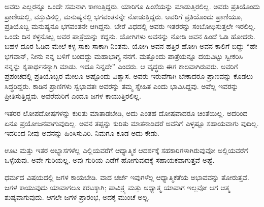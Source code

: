 ಅವರು ಎಲ್ಲರನ್ನೂ ಒಂದೇ ಸಮನಾಗಿ ಕಾಣುತ್ತಿದ್ದರು. ಯಾರಿಗೂ ಹಿಂಸೆಯನ್ನು ಮಾಡುತ್ತಿರಲಿಲ್ಲ. ಅವರು ಪ್ರತಿಯೊಂದು ಪ್ರಾಣಿಯಲ್ಲಿ, ವಸ್ತುವಿನಲ್ಲಿ, ಮನುಷ್ಯನಲ್ಲಿ ಭಗವಂತನನ್ನೇ ನೋಡುತ್ತಿದ್ದರು. ಅವರಿಗೆ ಪ್ರತಿಯೊಂದು ಪ್ರಾಣಿಯೂ, ಪ್ರತಿಯೊಬ್ಬ ಮನುಷ್ಯನೂ ಭಗವಂತನೇ ಆಗಿದ್ದನು. ಬೇರೆ ವಿಧದಲ್ಲಿ ಅವರು ಇತರರನ್ನು ಸಂಬೋಧಿಸುತ್ತಲೇ ಇರಲಿಲ್ಲ. ಒಂದು ದಿನ ಕಳ್ಳನೊಬ್ಬ ಅವರ ಪಾತ್ರೆಯನ್ನು ಕದ್ದನು. ಯೋಗಿಗಳು ಅವನನ್ನು ನೋಡಿ ಅವನ ಹಿಂದೆ ಓಡಿ ಹೋದರು. ಬಹಳ ದೂರ ಓಡಿದ ಮೇಲೆ ಕಳ್ಳ ಸಾಕು ಸಾಕಾಗಿ ನಿಂತನು. ಯೋಗಿ ಅವನ ಹತ್ತಿರ ಹೋಗಿ ಅವನ ಕಾಲಿಗೆ ಬಿದ್ದು “ಹೇ ಭಗವಾನ್​, ನೀನು ನನ್ನ ಬಳಿಗೆ ಬಂದದ್ದು ಮಹಾಭಾಗ್ಯ ನನಗೆ. ಮತ್ತೊಂದು ಪಾತ್ರೆಯನ್ನೂ ದಯವಿಟ್ಟು ಸ್ವೀಕರಿಸಿ ನನ್ನನ್ನು ಕೃತಾರ್ಥನನ್ನಾಗಿ ಮಾಡು. ಇದೂ ನಿನ್ನದೇ” ಎಂದರು. ಆ ವೃದ್ಧರು ಈಗ ಕಾಲವಾಗಿರುವರು. ಅವರಿಗೆ ಪ್ರಪಂಚದಲ್ಲಿ ಪ್ರತಿಯೊಬ್ಬರ ಮೇಲೂ ಅಷ್ಟೊಂದು ವಿಶ್ವಾಸ. ಅವರು ಇರುವೆಗಾಗಿ ಬೇಕಾದರೂ ಪ್ರಾಣವನ್ನು ಕೊಡಲು ಸಿದ್ಧರಿದ್ದರು. ಕಾಡಿನ ಪ್ರಾಣಿಗಳು ಸ್ವಭಾವತಃ ಅವರನ್ನು ತಮ್ಮ ಸ್ನೇಹಿತ ಎಂದು ಭಾವಿಸಿದ್ದವು. ಅವೆಲ್ಲ ಇವರನ್ನು ಪ್ರೀತಿಸುತ್ತಿದ್ದವು. ಅವರೆದುರಿಗೆ ಎಂದೂ ಜಗಳ ಕಾಯುತ್ತಿರಲಿಲ್ಲ.

ಇತರರ ಲೋಪದೋಷಗಳನ್ನು ಕುರಿತು ಮಾತಾಡಬೇಡಿ, ಅದು ಎಂತಹ ದೋಷವಾದರೂ ಚಿಂತೆಯಿಲ್ಲ. ಅದರಿಂದ ಏನೂ ಪ್ರಯೋಜನವಾಗುವುದಿಲ್ಲ. ಅವನ ತಪ್ಪನ್ನು ಕುರಿತು ಮಾತನಾಡಿದರೆ ಅವನಿಗೆ ಎಳ್ಳಷ್ಟೂ ಸಹಾಯವಾಗು ವುದಿಲ್ಲ. ಇದರಿಂದ ನೀವು ಅವನನ್ನು ಹಿಂಸಿಸುವಿರಿ. ನಿಮಗೂ ಕೂಡ ಅದು ಕೇಡು.

ಊಟ ಮತ್ತು ಇತರ ಅಭ್ಯಾಸಗಳೆಲ್ಲ ಎಲ್ಲಿಯವರೆಗೆ ಆಧ್ಯಾತ್ಮಿಕ ಆದರ್ಶಕ್ಕೆ ಸಹಕಾರಿಗಳಾಗಿರುವುವೋ ಅಲ್ಲಿಯವರೆಗೆ ಒಳ್ಳೆಯವು. ಅವೇ ಗುರಿಯಲ್ಲ. ಅವು ಗುರಿಯ ಎಡೆಗೆ ಹೋಗುವುದಕ್ಕೆ ಸಹಾಯಕವಾಗುತ್ತವೆ ಅಷ್ಟೆ.

ಧರ್ಮದ ವಿಷಯದಲ್ಲಿ ಜಗಳ ಕಾಯಬೇಡಿ. ವಾದ ಚರ್ಚೆ ಇವುಗಳೆಲ್ಲ ಆಧ್ಯಾತ್ಮಿಕತೆಯ ಅಭಾವವನ್ನು ತೋರುತ್ತವೆ. ಜಗಳ ಕಾಯುವುದು ಯಾವಾಗಲೂ ಕರಟಕ್ಕಾಗಿ; ಪಾವಿತ್ರ್ಯ ಮತ್ತು ಅಧ್ಯಾತ್ಮ ಯಾವಾಗ ಇಲ್ಲವೋ ಆಗ ಆತ್ಮ ಶುಷ್ಕವಾಗುವುದು. ಆಗಲೇ ಜಗಳ ಪ್ರಾರಂಭ, ಅದಕ್ಕೆ ಮುಂಚೆ ಅಲ್ಲ.

